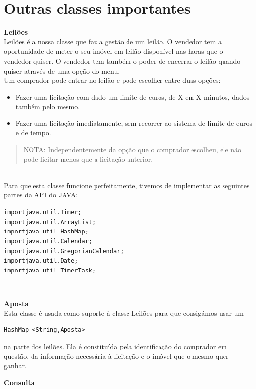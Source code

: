 \documentclass[12pt]{article}
\newenvironment{code}                    
{\textbf{
} \hspace{1cm} \hrulefill \\ 
\smallskip 
\begin{center}
\begin{minipage}{0.9\textwidth} 
\begin{alltt}\small}
{\end{alltt}
\end{minipage}
\end{center}
\hrule\smallskip
}
\begin{document}
\pagebreak
\section{Outras classes importantes}

\textbf{Leilões}
\newline
~\\

Leilões é a nossa classe que faz a gestão de um leilão. O vendedor tem a oportunidade de meter o seu imóvel em leilão disponível nas horas que o vendedor quiser. O vendedor tem também o poder de encerrar o leilão quando quiser através de uma opção do menu.
~\\

Um comprador pode entrar no leilão e pode escolher entre duas opções:
\begin{itemize}
\item Fazer uma licitação com dado um limite de euros, de X em X minutos, dados também pelo mesmo. 
\item Fazer uma licitação imediatamente, sem recorrer ao sistema de limite de euros e de tempo.
\end{itemize}
\begin{quote}
NOTA: Independentemente da opção que o comprador escolheu, ele não pode licitar menos que a licitação anterior.
\end{quote}
~\\

Para que esta classe funcione perfeitamente, tivemos de implementar as seguintes partes da API do JAVA:
\newline
\begin{code}
import java.util.Timer;
import java.util.ArrayList;
import java.util.HashMap;
import java.util.Calendar;
import java.util.GregorianCalendar;
import java.util.Date;
import java.util.TimerTask;
\end{code}
~\\
\textbf{Aposta}
\newline
~\\

Esta classe é usada como suporte à classe Leilões para que consigámos usar um 
\begin{verbatim}
HashMap <String,Aposta>
\end{verbatim}
na parte dos leilões.
Ela é constituída pela identificação do comprador em questão, da informação necessária à licitação e o imóvel que o mesmo quer ganhar.

\textbf{Consulta}
\newline
~\\
\end{document}
